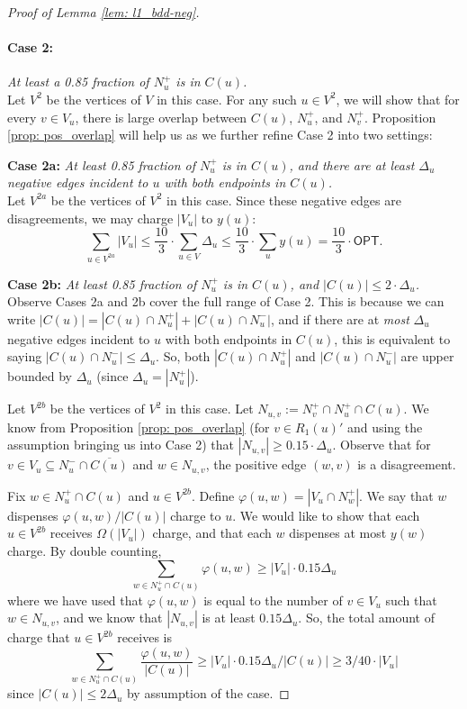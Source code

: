 \documentclass[11pt]{article}
\begin{document}
\begin{proof}[Proof of Lemma \ref{lem: l1_bdd-neg}]
\paragraph{Case 2: }\emph{At least a 0.85 fraction of $N_u^+$ is in $C(u)$.} \\
Let $V^2$ be the vertices of $V$ in this case. 
For any such $u \in V^2$, we will show that for every $v \in V_u$, 
there is large overlap between $C(u)$, $N_u^+$, and $N_v^+$. 
Proposition \ref{prop: pos_overlap} will help us as we further refine Case 2 into two settings: 
\medskip

\noindent \textbf{Case 2a:} \emph{At least 0.85 fraction of $N_u^+$ is in $C(u)$, and there are at least $\Delta_u$ negative edges incident to $u$ with both endpoints in $C(u)$.}\\ 
Let $V^{2a}$ be the vertices of $V^2$ in this case. 
Since these negative edges are disagreements, we may charge $|V_u|$ to $y(u)$:
$$\boxed{\sum_{u \in V^{2a}} |V_u| \leq \frac{10}{3} \cdot \sum_{u \in V} \Delta_u \leq \frac{10}{3}\cdot \sum_u y(u) = \frac{10}{3} \cdot \textsf{OPT}.}$$

\noindent \textbf{Case 2b:} \emph{At least 0.85 fraction of $N_u^+$ is in $C(u)$, and $|C(u)| \leq 2 \cdot \Delta_u$.}\\
Observe Cases 2a and 2b cover the full range of Case 2. 
This is because we can write $|C(u)| = |C(u)\cap N_u^+| + |C(u)\cap N_u^-|$, 
and if there are at \emph{most} $\Delta_u$ negative edges incident to $u$ with both endpoints in $C(u)$, this is equivalent to saying $|C(u)\cap N_u^-| \leq \Delta_u$.
So, both $|C(u)\cap N_u^+|$ and $|C(u)\cap N_u^-|$ are upper bounded by $\Delta_u$ (since $\Delta_u = |N_u^+|$).

\smallskip

Let $V^{2b}$ be the vertices of $V^2$ in this case. 
Let $N_{u,v} := N_v^+ \cap N_u^+ \cap C(u)$. We know from Proposition \ref{prop: pos_overlap} (for $v \in R_1(u)'$ and using the assumption bringing us into Case 2) that $|N_{u,v}| \geq 0.15 \cdot \Delta_u$.  
Observe that for $v \in V_u \subseteq N_u^- \cap \overline{C(u)}$ 
and $w \in N_{u,v}$, the positive edge $(w,v)$ is a disagreement.

Fix $w \in N_u^+ \cap C(u)$ and $u \in V^{2b}$. Define $\varphi(u,w) = |V_u \cap N_w^+|$. We say that $w$ dispenses $\varphi(u,w)/|C(u)|$ charge to $u$. We would like to show that each $u \in V^{2b}$ receives $\Omega(|V_u|)$ charge, and that each $w$ dispenses at most $y(w)$ charge. By double counting,  
$$\sum_{w \in N_u^+ \cap C(u)} \varphi(u,w) \geq |V_u| \cdot 0.15\Delta_u $$
where we have used that $\varphi(u,w)$ is equal to the number of $v \in V_u$ such that $w \in N_{u,v}$, and we know that $|N_{u,v}|$ is at least $0.15 \Delta_u$. So, the total amount of charge that $u \in V^{2b}$ receives is 
$$\sum_{w \in N_u^+ \cap C(u)} \frac{\varphi(u,w)}{|C(u)|} \geq |V_u| \cdot 0.15 \Delta_u / |C(u)| \geq 3/40 \cdot |V_u|$$
since $|C(u)| \leq 2\Delta_u$ by assumption of the case. 


\end{proof}
\end{document}
